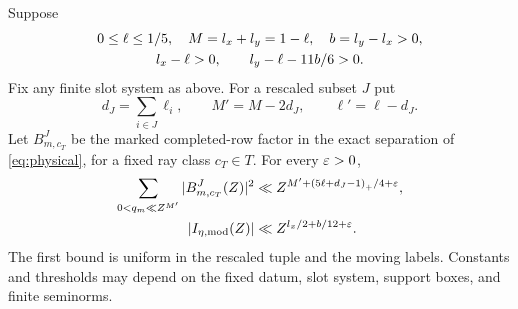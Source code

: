 \begin{theorem}\label{thm:low}
Suppose
\begin{gather}\label{eq:lowhyp}
 0\le\ell\le1/5,\quad M=l_x+l_y=1-\ell,\quad b=l_y-l_x>0,\\
 l_x-\ell>0,\qquad l_y-\ell-11b/6>0.\notag
\end{gather}
Fix any finite slot system as above. For a rescaled subset $J$ put
\[
 d_J=\sum_{i\in J}\ell_i,\qquad M'=M-2d_J,\qquad\ell'=\ell-d_J.
\]
Let $B^J_{m,c_T}$ be the marked completed-row factor in the exact separation of \eqref{eq:physical}, for a fixed ray class $c_T\in T$. For every $\varepsilon>0$,
\begin{align}
 \sum_{0<q_m\ll Z^{M'}}|B^J_{m,c_T}(Z)|^2
 &\ll Z^{M'+\left(5\ell+d_J-1\right)_+/4+\varepsilon},\label{eq:completed}\\
 |I_{\eta,{\rm mod}}(Z)|&\ll Z^{l_x/2+b/12+\varepsilon}.
 \label{eq:low}
\end{align}
The first bound is uniform in the rescaled tuple and the moving labels. Constants and thresholds may depend on the fixed datum, slot system, support boxes, and finite seminorms.
\end{theorem}
